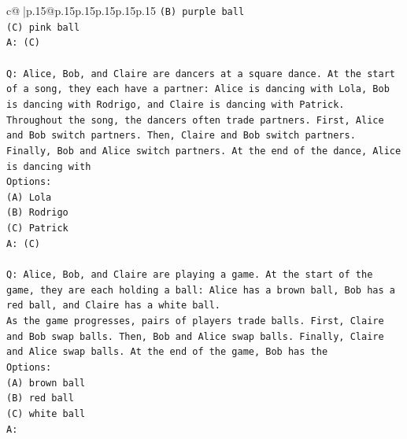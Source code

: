 \documentclass{article}
\begin{document}
{\begin{supertabular}{c@{$\;$}|p{.15\linewidth}@{}p{.15\linewidth}p{.15\linewidth}p{.15\linewidth}p{.15\linewidth}p{.15\linewidth}}
{{{\texttt{(B) purple ball} \\
\texttt{(C) pink ball} \\
\texttt{A: (C)} \\
\\ 
\texttt{Q: Alice, Bob, and Claire are dancers at a square dance. At the start of a song, they each have a partner: Alice is dancing with Lola, Bob is dancing with Rodrigo, and Claire is dancing with Patrick.} \\
\texttt{Throughout the song, the dancers often trade partners. First, Alice and Bob switch partners. Then, Claire and Bob switch partners. Finally, Bob and Alice switch partners. At the end of the dance, Alice is dancing with} \\
\texttt{Options:} \\
\texttt{(A) Lola} \\
\texttt{(B) Rodrigo} \\
\texttt{(C) Patrick} \\
\texttt{A: (C)} \\
\\ 
\texttt{Q: Alice, Bob, and Claire are playing a game. At the start of the game, they are each holding a ball: Alice has a brown ball, Bob has a red ball, and Claire has a white ball.} \\
\texttt{As the game progresses, pairs of players trade balls. First, Claire and Bob swap balls. Then, Bob and Alice swap balls. Finally, Claire and Alice swap balls. At the end of the game, Bob has the} \\
\texttt{Options:} \\
\texttt{(A) brown ball} \\
\texttt{(B) red ball} \\
\texttt{(C) white ball} \\
\texttt{A:} \\
            }
        }
    }
     \\ \\


\end{supertabular}}
\end{document}

